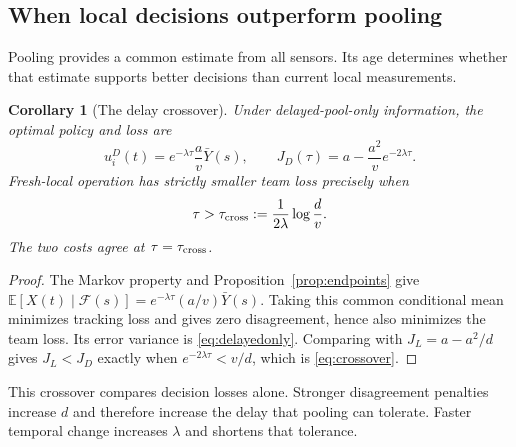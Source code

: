 \documentclass[letterpaper,10pt,conference]{ieeeconf}
\newtheorem{corollary}{Corollary}
\newcommand{\E}{\mathbb E}
\begin{document}
\subsection{When local decisions outperform pooling}
Pooling provides a common estimate from all sensors. Its age determines whether that estimate supports better decisions than current local measurements.
\begin{corollary}[The delay crossover]\label{cor:crossover}
Under delayed-pool-only information, the optimal policy and loss are
\begin{equation}
 u_i^D(t)=e^{-\lambda\tau}\frac av\bar Y(s),\qquad
 J_D(\tau)=a-\frac{a^2}{v}e^{-2\lambda\tau}.\label{eq:delayedonly}
\end{equation}
Fresh-local operation has strictly smaller team loss precisely when
\begin{equation}
 \tau>\tau_{\rm cross}:=\frac{1}{2\lambda}\log\frac{d}{v}.\label{eq:crossover}
\end{equation}
The two costs agree at $\tau=\tau_{\rm cross}$.
\end{corollary}
\begin{proof}
The Markov property and Proposition~\ref{prop:endpoints} give
$\E[X(t)\mid\mathcal F(s)]=e^{-\lambda\tau}(a/v)\bar Y(s)$. Taking this common conditional mean minimizes tracking loss and gives zero disagreement, hence also minimizes the team loss. Its error variance is \eqref{eq:delayedonly}. Comparing with $J_L=a-a^2/d$ gives $J_L<J_D$ exactly when $e^{-2\lambda\tau}<v/d$, which is \eqref{eq:crossover}.
\end{proof}
This crossover compares decision losses alone. Stronger disagreement penalties increase $d$ and therefore increase the delay that pooling can tolerate. Faster temporal change increases $\lambda$ and shortens that tolerance.
\end{document}
